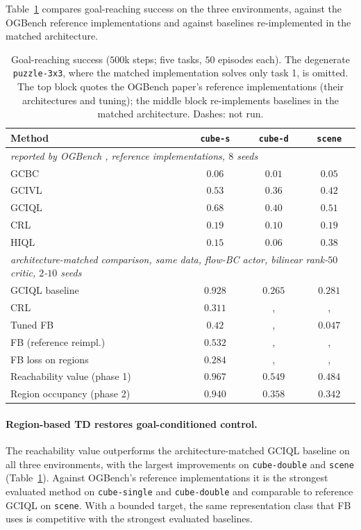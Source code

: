 \documentclass{article}
\begin{document}
Table~\ref{tab:main} compares goal-reaching success on the three environments, against the OGBench reference implementations and against baselines re-implemented in the matched architecture.

\begin{table}[t]
\centering\small
\begin{tabular}{l ccc}
\toprule
Method & \texttt{cube-s} & \texttt{cube-d} & \texttt{scene} \\
\midrule
\multicolumn{4}{l}{\emph{reported by OGBench \citep{park2024ogbench}, reference implementations, $8$ seeds}} \\
GCBC   & $0.06$ & $0.01$ & $0.05$ \\
GCIVL  & $0.53$ & $0.36$ & $0.42$ \\
GCIQL  & $0.68$ & $0.40$ & $0.51$ \\
CRL    & $0.19$ & $0.10$ & $0.19$ \\
HIQL   & $0.15$ & $0.06$ & $0.38$ \\
\midrule
\multicolumn{4}{l}{\emph{architecture-matched comparison, same data, flow-BC actor, bilinear rank-$50$ critic, $2$-$10$ seeds}} \\
GCIQL baseline           & $0.928$ & $0.265$ & $0.281$ \\
CRL                      & $0.311$ & ,     & ,     \\
Tuned FB                 & $0.42$  & ,     & $0.047$ \\
FB (reference reimpl.)   & $0.532$ & ,     & ,     \\
FB loss on regions       & $0.284$ & ,     & ,     \\
\midrule
Reachability value (phase 1) & $\mathbf{0.967}$ & $\mathbf{0.549}$ & $\mathbf{0.484}$ \\
Region occupancy (phase 2)   & $0.940$ & $0.358$ & $0.342$ \\
\bottomrule
\end{tabular}
\caption{Goal-reaching success ($500$k steps; five tasks, $50$ episodes each).
The degenerate \texttt{puzzle-3x3}, where the matched implementation solves only task 1, is omitted.
The top block quotes the OGBench paper's reference implementations (their architectures and tuning); the middle block re-implements baselines in the matched architecture. Dashes: not run.}
\label{tab:main}
\end{table}

\paragraph{Region-based TD restores goal-conditioned control.}
The reachability value outperforms the architecture-matched GCIQL baseline on all three environments, with the largest improvements on \texttt{cube-double} and \texttt{scene} (Table~\ref{tab:main}).
Against OGBench's reference implementations it is the strongest evaluated method on \texttt{cube-single} and \texttt{cube-double} and comparable to reference GCIQL on \texttt{scene}.
With a bounded target, the same representation class that FB uses is competitive with the strongest evaluated baselines.
\end{document}
